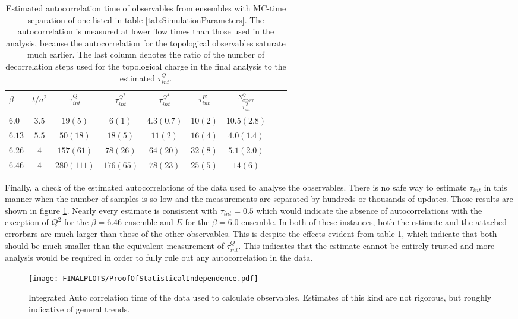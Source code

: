 \documentclass[a4paper,10pt]{book}
\begin{document}
\begin{table}[htbp]
\centering
\caption[Integrated Autocorrelation time of observables]{Estimated autocorrelation time of observables from ensembles with MC-time separation of one listed in table \ref{tab:SimulationParameters}. The autocorrelation is measured at lower flow times than those used in the analysis, because the autocorrelation for the topological observables saturate much earlier. The last column denotes the ratio of the number of decorrelation steps used for the topological charge in the final analysis to the estimated $\tau_{int}^Q$.}
\label{tab:IntAutocorrs}
\begin{tabular}{lcccccccc}
\hline \hline  $\beta$ 	& $t/a^2$ 	&$\tau_{int}^Q$	& $\tau_{int}^{Q^2}$ 	& $\tau_{int}^{Q^4}$	& $\tau_{int}^E$	& $\frac{N_{decorr}^Q}{\tau_{int}^{Q}}$		\\
\hline		   $6.0$ 	& $3.5$ 	& $19(5)$		& $6(1)$			& $4.3(0.7)$   		& $10(2)$					&  $10.5(2.8)$ 			\\	  
	  		   $6.13$	& $5.5$ 	& $50(18)$		& $18(5)$		   	& $11(2)$			& $16(4)$ 					&  $4.0(1.4)$			\\
	  		   $6.26$	& $4$ 		& $157(61)$		& $78(26)$		   	& $64(20)$			& $32(8)$ 					&  $5.1(2.0)$			\\
	  		   $6.46$	& $4$ 		& $280(111)$	& $176(65)$		   	& $78(23)$		 	& $25(5)$ 					&  $14(6)$			\\
\end{tabular}
\end{table}
Finally, a check of the estimated autocorrelations of the data used to analyse the observables. There is no safe way to estimate $\tau_{int}$ in this manner when the number of samples is so low and the measurements are separated by hundreds or thousands of updates. Those results are shown in figure \ref{fig:intAutocorr_Measurements}. Nearly every estimate is consistent with $\tau_{int}=0.5$ which would indicate the absence of autocorrelations with the exception of $Q^2$ for the $\beta=6.46$ ensemble and $E$ for the $\beta=6.0$ ensemble. In both of these instances, both the estimate and the attached errorbars are much larger than those of the other observables. This is despite the effects evident from table \ref{tab:IntAutocorrs}, which indicate that both should be much smaller than the equivalent measurement of $\tau_{int}^Q$. This indicates that the estimate cannot be entirely trusted and more analysis would be required in order to fully rule out any autocorrelation in the data.
\begin{figure}
\centering
\texttt{[image: FINALPLOTS/ProofOfStatisticalIndependence.pdf]}
\caption[Estimates of $\tau_{int}$ for measured ensembles]{Integrated Auto correlation time of the data used to calculate observables. Estimates of this kind are not rigorous, but roughly indicative of general trends.}\label{fig:intAutocorr_Measurements}
\end{figure}
\end{document}
